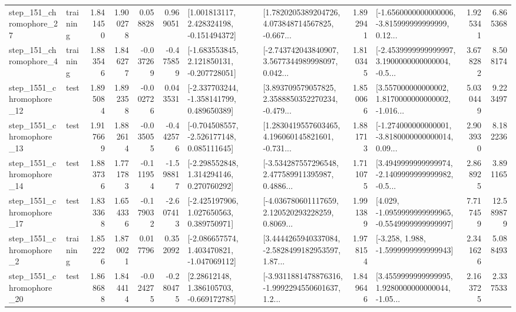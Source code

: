\begin{tabular}{llrrrrllrlrr}
  step\_151\_chromophore\_27 &  training &      1.841450 &    1.900278 &      0.058828 &  0.969051 &    [1.001813117, 2.428324198, -0.151494372] &  [1.7820205389204726, 4.073848714567825, -0.667... &       1.892941 &  [-1.6560000000000006, -3.815999999999999, 0.12... &            1.925341 &          6.865368 \\
   step\_151\_chromophore\_4 &  training &      1.883546 &    1.846277 &     -0.037269 & -0.475859 &   [-1.683553845, 2.121850131, -0.207728051] &  [-2.743742043840907, 3.5677344989998097, 0.042... &       1.810345 &  [-2.4539999999999997, 3.1900000000000004, -0.5... &            3.678282 &          8.508174 \\
 step\_1551\_chromophore\_12 &      test &      1.895084 &    1.892358 &     -0.002726 &  0.043531 &   [-2.337703244, -1.358141799, 0.489650389] &  [3.893709579057825, 2.3588850352270234, -0.479... &       1.850066 &  [3.557000000000002, 1.8170000000000002, -1.016... &            5.030449 &          9.223497 \\
 step\_1551\_chromophore\_13 &      test &      1.917669 &    1.882614 &     -0.035055 & -0.442576 &   [-0.704508557, -2.526177148, 0.085111645] &  [1.2830419557603465, 4.196060145821601, -0.731... &       1.881713 &  [-1.274000000000001, -3.8180000000000014, 0.09... &            2.903930 &          8.182236 \\
 step\_1551\_chromophore\_14 &      test &      1.883736 &    1.771783 &     -0.111954 & -1.598817 &    [-2.298552848, 1.314294146, 0.270760292] &  [-3.534287557296548, 2.477589911395987, 0.4886... &       1.711075 &  [3.4949999999999974, -2.1409999999999982, -0.5... &            2.868925 &          3.891165 \\
 step\_1551\_chromophore\_17 &      test &      1.833368 &    1.654336 &     -0.179032 & -2.607413 &    [-2.425197906, 1.027650563, 0.389750971] &  [-4.036780601117659, 2.120520293228259, 0.8069... &       1.991389 &  [4.029, -1.0959999999999965, -0.5549999999999997] &            7.717459 &         12.589879 \\
  step\_1551\_chromophore\_2 &  training &      1.852226 &    1.870021 &      0.017796 &  0.352092 &   [-2.086657574, 1.403470821, -1.047069112] &  [3.4444265940337084, -2.5828499182953597, 1.87... &       1.978154 &               [-3.258, 1.988, -1.5999999999999943] &            2.341626 &          5.088493 \\
 step\_1551\_chromophore\_20 &      test &      1.868688 &    1.844414 &     -0.024275 & -0.280475 &     [2.28612148, 1.386105703, -0.669172785] &  [-3.9311881478876316, -1.9992294550601637, 1.2... &       1.849646 &  [3.4559999999999995, 1.9280000000000044, -1.05... &            2.163725 &          2.337533 \\

\end{tabular}
